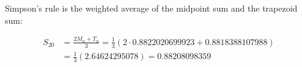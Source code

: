 \documentclass[10pt]{article}
\newenvironment{red}{\color{red}}{\ignorespacesafterend}
\begin{document}
\begin{enumerate}[leftmargin=0pt]
\begin{enumerate}
    \begin{red}
    Simpson's rule is the weighted average of the midpoint sum and the trapezoid sum:
    
    \begin{align*}
        S_{20} &= \frac{2M_n + T_n}{3} 
        = \frac{1}{3}(2 \cdot 0.8822020699923 + 0.8818388107988) \\
        &= \frac{1}{3}( 2.64624295078 ) = 0.88208098359
    \end{align*}
    \end{red}
\end{enumerate}

\end{enumerate}
\end{document}
